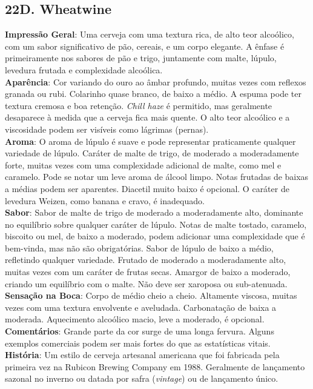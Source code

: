 \subsection*{22D. Wheatwine}
\textbf{Impressão Geral}: Uma cerveja com uma textura rica, de alto teor alcoólico, com um sabor significativo de pão, cereais, e um corpo elegante. A ênfase é primeiramente nos sabores de pão e trigo, juntamente com malte, lúpulo, levedura frutada e complexidade alcoólica. \\
\textbf{Aparência}: Cor variando do ouro ao âmbar profundo, muitas vezes com reflexos granada ou rubi. Colarinho quase branco, de baixo a médio. A espuma pode ter textura cremosa e boa retenção. \textit{Chill haze} é permitido, mas geralmente desaparece à medida que a cerveja fica mais quente. O alto teor alcoólico e a viscosidade podem ser visíveis como lágrimas (pernas). \\
\textbf{Aroma}: O aroma de lúpulo é suave e pode representar praticamente qualquer variedade de lúpulo. Caráter de malte de trigo, de moderado a moderadamente forte, muitas vezes com uma complexidade adicional de malte, como mel e caramelo. Pode se notar um leve aroma de álcool limpo. Notas frutadas de baixas a médias podem ser aparentes. Diacetil muito baixo é opcional. O caráter de levedura Weizen, como banana e cravo, é inadequado. \\
\textbf{Sabor}: Sabor de malte de trigo de moderado a moderadamente alto, dominante no equilíbrio sobre qualquer caráter de lúpulo. Notas de malte tostado, caramelo, biscoito ou mel, de baixo a moderado, podem adicionar uma complexidade que é bem-vinda, mas não são obrigatórias. Sabor de lúpulo de baixo a médio, refletindo qualquer variedade. Frutado de moderado a moderadamente alto, muitas vezes com um caráter de frutas secas. Amargor de baixo a moderado, criando um equilíbrio com o malte. Não deve ser xaroposa ou sub-atenuada. \\
\textbf{Sensação na Boca}: Corpo de médio cheio a cheio. Altamente viscosa, muitas vezes com uma textura envolvente e aveludada. Carbonatação de baixa a moderada. Aquecimento alcoólico macio, leve a moderado, é opcional. \\
\textbf{Comentários}: Grande parte da cor surge de uma longa fervura. Alguns exemplos comerciais podem ser mais fortes do que as estatísticas vitais. \\
\textbf{História}: Um estilo de cerveja artesanal americana que foi fabricada pela primeira vez na Rubicon Brewing Company em 1988. Geralmente de lançamento sazonal no inverno ou datada por safra (\textit{vintage}) ou de lançamento único. \\
